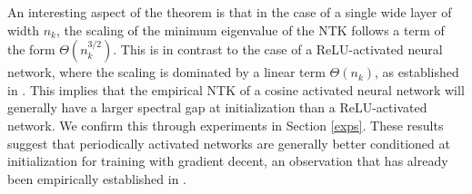 \documentclass{article}
\theoremstyle{plain}
\theoremstyle{definition}
\theoremstyle{remark}
\begin{document}
An interesting aspect of the theorem is that in the case of a single wide layer of width $n_k$, the scaling of the minimum eigenvalue of the NTK follows a term of the form $\Theta(n_k^{3/2})$. This is in contrast to the case of a ReLU-activated neural network, where the scaling is dominated by a linear term 
$\Theta(n_k)$, as established in \cite{nguyen2021tight}. This implies that the empirical NTK of a cosine activated neural network will generally have a larger spectral gap at initialization than a ReLU-activated network. We confirm this through experiments in Section \ref{exps}. These results suggest that periodically activated networks are generally better conditioned at initialization for training with gradient decent, an observation that has already been empirically established in \cite{sitzmann2020implicit}.
\end{document}
